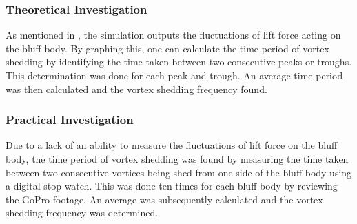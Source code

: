 \subsubsection{Theoretical Investigation}
As mentioned in , the simulation outputs the fluctuations of lift force acting on the bluff body. By graphing this, one can calculate the time period of vortex shedding by identifying the time taken between two consecutive peaks or troughs. This determination was done for each peak and trough. An average time period was then calculated and the vortex shedding frequency found.

\subsubsection{Practical Investigation}
Due to a lack of an ability to measure the fluctuations of lift force on the bluff body, the time period of vortex shedding was found by measuring the time taken between two consecutive vortices being shed from one side of the bluff body using a digital stop watch. This was done ten times for each bluff body by reviewing the GoPro footage. An average was subsequently calculated and the vortex shedding frequency was determined.